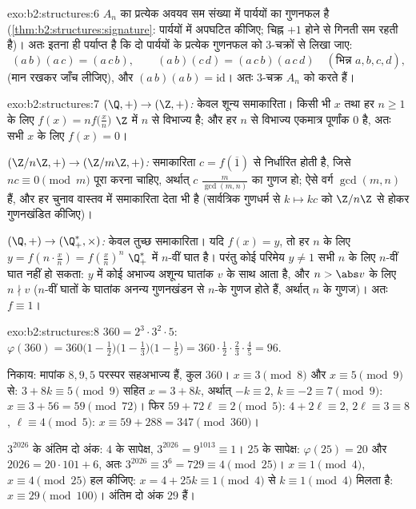 \begin{solution}{exo:b2:structures:6}
$A_n$ का प्रत्येक अवयव सम संख्या में पार्ययों का गुणनफल है (\cref{thm:b2:structures:signature}:
पार्ययों में अपघटित कीजिए; चिह्न $+1$ होने से गिनती सम रहती है)। अतः
इतना ही पर्याप्त है कि दो पार्ययों के प्रत्येक गुणनफल को $3$-चक्रों से
लिखा जाए:
\[
(a\,b)(a\,c) = (a\,c\,b),
\qquad
(a\,b)(c\,d) = (a\,c\,b)(a\,c\,d) \quad (\text{भिन्न } a,b,c,d),
\]
(मान रखकर जाँच लीजिए), और $(a\,b)(a\,b) = \mathrm{id}$। अतः $3$-चक्र $A_n$ को  करते हैं।
\end{solution}

\begin{solution}{exo:b2:structures:7}
\emph{$(\Q,+) \to (\Z,+)$:} केवल शून्य समाकारिता। किसी भी $x$ तथा हर $n \geq 1$ के लिए $f(x) = n f\bigl(\frac xn\bigr)$
$\Z$ में $n$ से विभाज्य है; और हर $n$ से विभाज्य एकमात्र पूर्णांक $0$
है, अतः सभी $x$ के लिए $f(x) = 0$।

\emph{$(\Z/n\Z, +) \to (\Z/m\Z, +)$:} समाकारिता $c = f(\overline 1)$ से निर्धारित होती है, जिसे $n c \equiv 0 \pmod m$ पूरा करना
चाहिए, अर्थात् $c$ $\frac{m}{\gcd(m,n)}$ का गुणज हो; ऐसे वर्ग $\gcd(m,n)$ हैं, और हर चुनाव
वास्तव में समाकारिता देता भी है (सार्वत्रिक गुणधर्म से $k \mapsto kc$ को $\Z/n\Z$ से
होकर गुणनखंडित कीजिए)।

\emph{$(\Q, +) \to (\Q_+^*, \times)$:} केवल तुच्छ समाकारिता। यदि $f(x) = y$, तो हर $n$ के लिए $y = f(n \cdot \frac xn) =
f(\frac xn)^n$ $\Q_+^*$
में $n$-वीं घात है। परंतु कोई परिमेय $y \neq 1$ सभी $n$ के लिए $n$-वीं घात
नहीं हो सकता: $y$ में कोई अभाज्य अशून्य घातांक $v$ के साथ आता है, और
$n > \abs
v$ के लिए $n \nmid v$ ($n$-वीं घातों के घातांक अनन्य गुणनखंडन से $n$-के
गुणज होते हैं, अर्थात् $n$ के गुणज)। अतः $f \equiv 1$।
\end{solution}

\begin{solution}{exo:b2:structures:8}
$360 = 2^3 \cdot 3^2 \cdot 5$:
$\varphi(360) = 360\bigl(1 - \tfrac12\bigr)\bigl(1 -
\tfrac13\bigr)\bigl(1 - \tfrac15\bigr) = 360 \cdot \tfrac12 \cdot
\tfrac23 \cdot \tfrac45 = 96$.

निकाय: मापांक $8, 9, 5$ परस्पर सहअभाज्य हैं, कुल $360$। $x
\equiv 3 \pmod 8$ और $x \equiv 5 \pmod 9$ से: $3 +
8k \equiv 5 \pmod 9$
सहित $x = 3 + 8k$, अर्थात् $-k \equiv 2$, $k \equiv -2 \equiv 7
\pmod 9$: $x \equiv 3 + 56 = 59 \pmod{72}$। फिर $59 + 72\ell \equiv
2 \pmod 5$: $4 + 2\ell \equiv 2$, $2\ell \equiv 3 \equiv 8$, $\ell
\equiv 4 \pmod 5$: $x \equiv 59 + 288 = 347 \pmod{360}$।

$3^{2026}$ के अंतिम दो अंक: $4$ के सापेक्ष, $3^{2026} = 9^{1013} \equiv
1$। $25$ के सापेक्ष: $\varphi(25) = 20$ और $2026 = 20\cdot101 + 6$,
अतः $3^{2026} \equiv 3^6 = 729 \equiv 4 \pmod{25}$। $x \equiv 1
\pmod 4$, $x \equiv 4 \pmod{25}$ हल कीजिए: $x = 4 + 25k \equiv 1 \pmod 4$ से $k \equiv 1 \pmod 4$ मिलता है: $x \equiv 29 \pmod{100}$। अंतिम दो अंक
$29$ हैं।
\end{solution}

